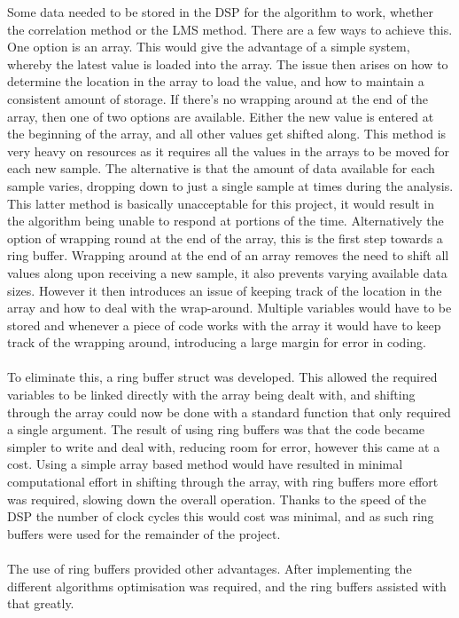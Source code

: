 Some data needed to be stored in the DSP for the algorithm to work, whether the correlation method or the LMS method.
There are a few ways to achieve this.
One option is an array.
This would give the advantage of a simple system, whereby the latest value is loaded into the array.
The issue then arises on how to determine the location in the array to load the value, and how to maintain a consistent amount of storage.
If there's no wrapping around at the end of the array, then one of two options are available.
Either the new value is entered at the beginning of the array, and all other values get shifted along.
This method is very heavy on resources as it requires all the values in the arrays to be moved for each new sample.
The alternative is that the amount of data available for each sample varies, dropping down to just a single sample at times during the analysis.
This latter method is basically unacceptable for this project, it would result in the algorithm being unable to respond at portions of the time.
Alternatively the option of wrapping round at the end of the array, this is the first step towards a ring buffer.
Wrapping around at the end of an array removes the need to shift all values along upon receiving a new sample, it also prevents varying available data sizes.
However it then introduces an issue of keeping track of the location in the array and how to deal with the wrap-around.
Multiple variables would have to be stored and whenever a piece of code works with the array it would have to keep track of the wrapping around, introducing a large margin for error in coding.
\\
\\
To eliminate this, a ring buffer struct was developed.
This allowed the required variables to be linked directly with the array being dealt with, and shifting through the array could now be done with a standard function that only required a single argument.
The result of using ring buffers was that the code became simpler to write and deal with, reducing room for error, however this came at a cost.
Using a simple array based method would have resulted in minimal computational effort in shifting through the array, with ring buffers more effort was required, slowing down the overall operation.
Thanks to the speed of the DSP the number of clock cycles this would cost was minimal, and as such ring buffers were used for the remainder of the project.
\\
\\
The use of ring buffers provided other advantages.
After implementing the different algorithms optimisation was required, and the ring buffers assisted with that greatly.
